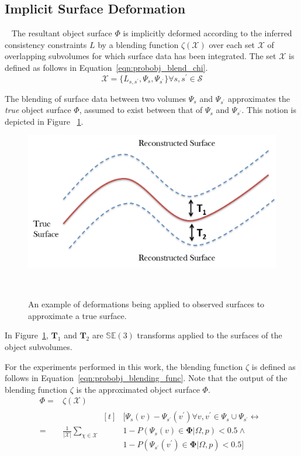\subsection{Implicit Surface Deformation}
~\label{subsec:probobj_implicit_surface_deform}
The resultant object surface \( \Phi \) is implicitly deformed according to the 
inferred consistency constraints \( L \) by a blending function \( \zeta(\mathcal{X}) \) 
over each set \( \mathcal{X} \) of overlapping subvolumes for which surface data has been integrated.
The set \( \mathcal{X} \) is defined as follows in Equation~\ref{eqn:probobj_blend_chi}.
\begin{equation}
  \label{eqn:probobj_blend_chi}
  \mathcal{X} = \Big\{ 
    L_{s, s^{'}}, \Psi_{s}, \Psi_{s^{'}} 
  \Big\}
  \forall s, s^{'} \in \mathcal{S}
\end{equation}

The blending of surface data between two volumes \( \Psi_{s} \) and \( \Psi_{s^{'}} \) 
approximates the \textit{true} object surface \( \Phi \), assumed to exist between that of 
\( \Psi_{s} \) and \( \Psi_{s^{'}} \). This notion is depicted in Figure
~\ref{figure:probobj_implicit_surface}.
\begin{figure}[!htbp]
  \centering
  \includegraphics[width=.6\linewidth]{figures/object_recon/deformation.png}
  \caption[Implicit Surface Deformation]{An example of deformations being applied to observed surfaces 
  to approximate a true surface.}
~\label{figure:probobj_implicit_surface}
\end{figure}
In Figure~\ref{figure:probobj_implicit_surface}, \( \bm{T}_{1} \) and \( \bm{T}_{2} \) are 
\( \mathbb{SE}(3) \) transforms applied to the surfaces of the object subvolumes.

For the experiments performed in this work, the blending function \( \zeta \) is defined as follows in 
Equation~\ref{eqn:probobj_blending_func}. Note that the output of the blending function \( \zeta \) is 
the approximated object surface \( \Phi \).
\begin{align}
  \label{eqn:probobj_blending_func}
  \Phi ={}& \zeta(\mathcal{X}) \\
  ={}&
  \frac{1}{\left| \mathcal{X} \right|} \sum_{\chi \in \mathcal{X}} 
    \begin{aligned}[t]
      {}& \Big[ 
        \Psi_{s}(v) - \Psi_{s^{'}}(v^{'})
        \forall v, v^{'} \in \Psi_{s} \cup \Psi_{s^{'}}
        \leftrightarrow \\ 
      {}& 1 - P(\Psi_{s}(v) \in \mathbf{\Phi} | \Omega, p) < 0.5 \wedge \\
      {}& 1 - P(\Psi_{s^{'}}(v^{'}) \in \mathbf{\Phi} | \Omega, p) < 0.5
      \Big]
    \end{aligned}
\end{align}

